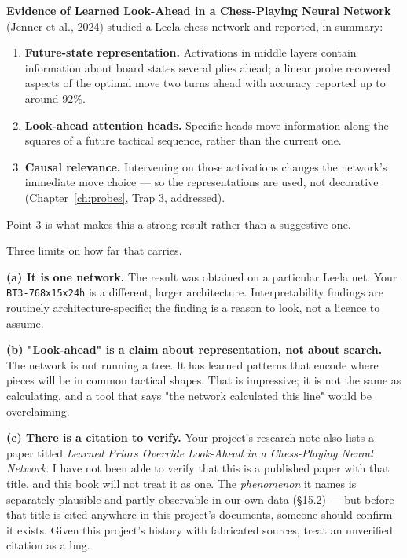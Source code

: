 \begin{researchfinding}
\textbf{Evidence of Learned Look-Ahead in a Chess-Playing Neural Network} (Jenner et al.,
2024) studied a Leela chess network and reported, in summary:
\begin{enumerate}
\item \textbf{Future-state representation.} Activations in middle layers contain information
  about board states several plies ahead; a linear probe recovered aspects of the optimal move
  two turns ahead with accuracy reported up to around $92\%$.
\item \textbf{Look-ahead attention heads.} Specific heads move information along the squares
  of a future tactical sequence, rather than the current one.
\item \textbf{Causal relevance.} Intervening on those activations changes the network's
  immediate move choice --- so the representations are used, not decorative
  (Chapter~\ref{ch:probes}, Trap 3, addressed).
\end{enumerate}
Point 3 is what makes this a strong result rather than a suggestive one.
\end{researchfinding}

\begin{pitfall}
Three limits on how far that carries.

\textbf{(a) It is one network.} The result was obtained on a particular Leela net. Your
\texttt{BT3-768x15x24h} is a different, larger architecture. Interpretability findings are
routinely architecture-specific; the finding is a reason to look, not a licence to assume.

\textbf{(b) "Look-ahead" is a claim about representation, not about search.} The network is
not running a tree. It has learned patterns that encode where pieces will be in common
tactical shapes. That is impressive; it is not the same as calculating, and a tool that says
"the network calculated this line" would be overclaiming.

\textbf{(c) There is a citation to verify.} Your project's research note also lists a paper
titled \emph{Learned Priors Override Look-Ahead in a Chess-Playing Neural Network}. I have not
been able to verify that this is a published paper with that title, and this book will not
treat it as one. The \emph{phenomenon} it names is separately plausible and partly observable
in our own data (§15.2) --- but before that title is cited anywhere in this project's
documents, someone should confirm it exists. Given this project's history with fabricated
sources, treat an unverified citation as a bug.
\end{pitfall}

